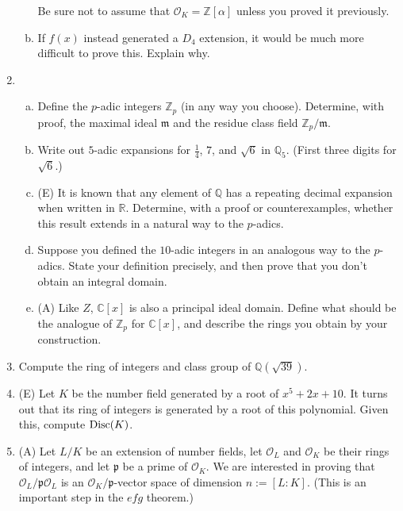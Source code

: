 \documentclass[12pt]{amsart}
\newcommand{\Disc}{{\text {\rm Disc}}}
\newcommand{\calO}{\mathcal{O}}
\newcommand{\p}{\mathfrak{p}}
\begin{document}
\begin{enumerate}[1.]
\begin{enumerate}[(a)]
Be sure not to assume that $\mathcal{O}_K = \mathbb{Z}[\alpha]$ unless you
proved it previously.
\item
If $f(x)$ instead generated a $D_4$ extension, it would be much more difficult to prove
this. Explain why.
\end{enumerate}

\vskip 0.5cm

\item
\begin{enumerate}[(a)]
\item Define the $p$-adic integers $\mathbb{Z}_p$ (in any way you choose). Determine,
with proof, the maximal ideal $\mathfrak{m}$ and the residue class field
$\mathbb{Z}_p / \mathfrak{m}$.
\item Write out $5$-adic expansions for $\frac{1}{4}$, $7$, and $\sqrt{6}$ in $\mathbb{Q}_5$.
(First three digits for $\sqrt{6}$.)

\item (E) It is known that any element of $\mathbb{Q}$ has a repeating decimal expansion when
written in $\mathbb{R}$. Determine, with a proof or counterexamples, whether this result
extends in a natural way to the $p$-adics.

\item Suppose you defined the $10$-adic integers in an analogous way to the $p$-adics.
State your definition precisely, and then prove that you don't obtain an integral domain.

\item (A) Like $Z$, $\mathbb{C}[x]$ is also a principal ideal domain. Define what should 
be the analogue of $\mathbb{Z}_p$ for $\mathbb{C}[x]$, and describe the rings you obtain
by your construction.

\end{enumerate}

\vskip 0.5cm
\item
Compute the ring of integers and class group of $\mathbb{Q}(\sqrt{39})$.

\vskip 0.5cm
\item
(E) Let $K$ be the number field generated by a root of $x^5 + 2x + 10$. It turns out that
its ring of integers is generated by a root of this polynomial. Given this, compute $\Disc(K)$.

\vskip 0.5cm
\item
(A) Let $L/K$ be an extension of number fields, let $\calO_L$ and $\calO_K$ be their rings
of integers, and let $\p$ be a prime of $\calO_K$. We are interested
in proving that $\calO_L / \p \calO_L$ is an $\calO_K/\p$-vector space of
dimension $n := [L : K]$. (This is an important step in the $efg$ theorem.)


\end{enumerate}
\end{document}
